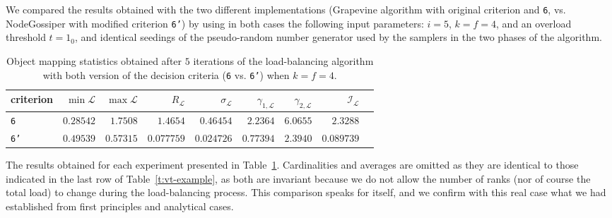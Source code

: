 
We compared the results obtained with the two different
implementations (Grapevine algorithm with original criterion and
\texttt{6}, vs. NodeGossiper with modified criterion \texttt{6'}) by
using in both cases the following input parameters: $i=5$, $k=f=4$,
and an overload threshold $t=1_0$, and identical seedings of the
pseudo-random number generator used by the samplers in the two phases
of the algorithm.

\begin{table}[htb!]
\begin{center}
\begin{tabular}{@{}lrrrrrrrr@{}}
\hline
criterion &
$\min{\mathcal{L}}$ & 
$\max{\mathcal{L}}$ &
$R_{\mathcal{L}}$ &
$\sigma_{\mathcal{L}}$ &
$\gamma_{1,\mathcal{L}}$ &
$\gamma_{2,\mathcal{L}}$ &
$\mathcal{I}_{\mathcal{L}}$ \\
\hline\hline
\texttt{6} &
$0.28542$ & $1.7508$ & $1.4654$ &
$0.46454$ & $2.2364$ & $6.0655$ &
$2.3288$  \\\hline
\texttt{6'} &
$0.49539$  & $0.57315$ & $0.077759$ &
$0.024726$ & $0.77394$ & $2.3940$ &
$0.089739$ \\\hline
\end{tabular}
\end{center}
\caption{\label{t:comparative_results} Object mapping statistics
obtained after $5$ iterations of the load-balancing algorithm with
both version of the decision criteria (\texttt{6} vs. \texttt{6'})
when $k=f=4$.}
\end{table}

The results obtained for each experiment  presented in
Table~\ref{t:comparative_results}. Cardinalities and averages are
omitted as they are identical to those indicated in the last row of
Table~\ref{t:vt-example}, as both are invariant because we do not
allow the number of ranks (nor of course the total load) to change
during the load-balancing process.
This comparison speaks for itself, and we confirm with this real case
what we had established from first principles and analytical cases.

 
